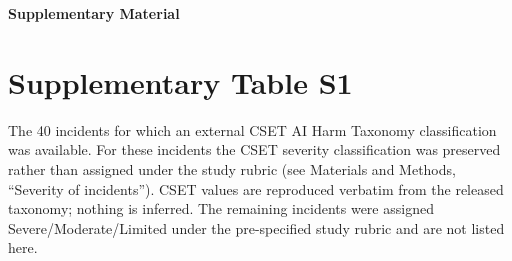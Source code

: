 \documentclass[11pt]{article}
\begin{document}
{\large\bfseries Supplementary Material}

\vspace{8pt}

\section*{Supplementary Table S1}

The 40 incidents for which an external CSET AI Harm Taxonomy classification was
available. For these incidents the CSET severity classification was preserved
rather than assigned under the study rubric (see Materials and Methods,
``Severity of incidents''). CSET values are reproduced verbatim from the
released taxonomy; nothing is inferred. The remaining incidents were assigned
Severe/Moderate/Limited under the pre-specified study rubric and are not listed
here.

\vspace{6pt}
\end{document}
